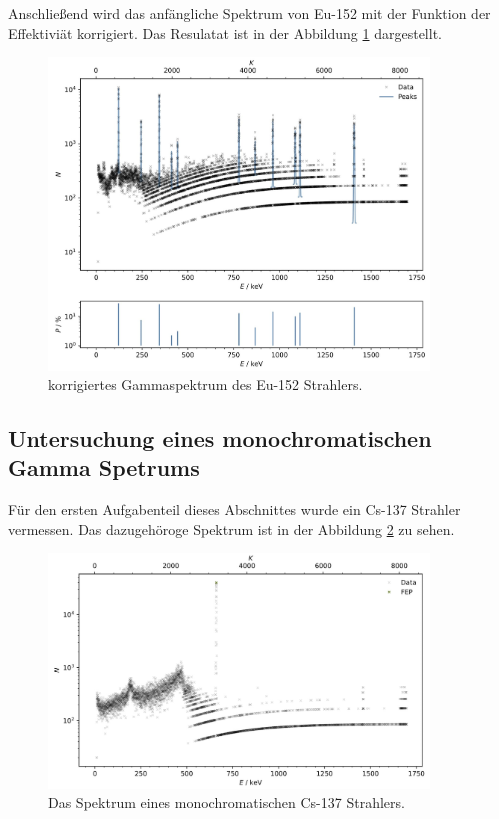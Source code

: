 Anschließend wird das anfängliche Spektrum von Eu-152 mit der Funktion der Effektiviät korrigiert.
Das Resulatat ist in der Abbildung \ref{fig:plot6} dargestellt.

\begin{figure}[H]
    \centering
    \includegraphics[width=0.9\textwidth]{content/plots/plot6.jpg}
   \caption{korrigiertes Gammaspektrum des Eu-152 Strahlers.}
    \label{fig:plot6}
\end{figure}

\subsection{Untersuchung eines monochromatischen Gamma Spetrums}
\label{sec:untersuchung gamma spektrum}

Für den ersten Aufgabenteil dieses Abschnittes wurde ein Cs-137 Strahler vermessen.
Das dazugehöroge Spektrum ist in der Abbildung \ref{fig:plot7} zu sehen.

\begin{figure}[H]
    \centering
    \includegraphics[width=0.9\textwidth]{content/plots/plot7.jpg}
    \caption{Das Spektrum eines monochromatischen Cs-137 Strahlers.}
    \label{fig:plot7}
\end{figure}

